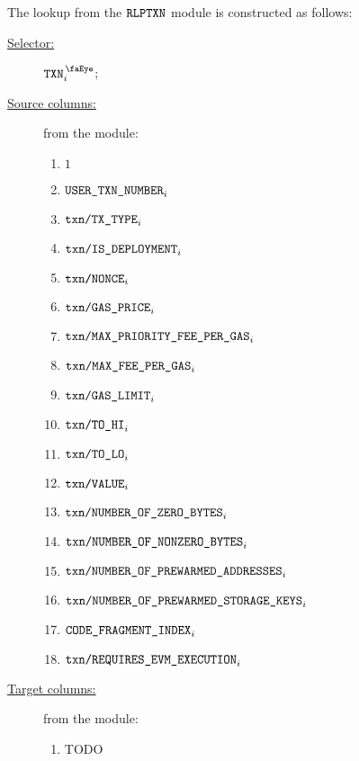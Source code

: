 The lookup from the $\texttt{RLPTXN}$ module is constructed as follows:
\begin{description}
	\item[\underline{Selector:}] $\isTxn _{i}$;
	\item[\underline{Source columns:}] from the \rlpTxnMod{} module:
		\begin{multicols}{3}
			\begin{enumerate}
				\item $1$
				\item $\texttt{USER}\texttt{\_}\texttt{TXN\_NUMBER}                       _{i}$
				\item $\texttt{txn}\texttt{/}\texttt{{TX\_TYPE}}               _{i}$
				\item $\texttt{txn}\texttt{/}\texttt{{IS\_DEPLOYMENT}}                _{i}$
				\item $\texttt{txn}\texttt{/}\texttt{{\texttt{NONCE}}}                _{i}$
				\item $\texttt{txn}\texttt{/}\texttt{{GAS\_PRICE}}             _{i}$
				\item $\texttt{txn}\texttt{/}\texttt{{MAX\_PRIORITY\_FEE\_PER\_GAS}} _{i}$
				\item $\texttt{txn}\texttt{/}\texttt{{MAX\_FEE\_PER\_GAS}}         _{i}$
				\item $\texttt{txn}\texttt{/}\texttt{{GAS\_LIMIT}}             _{i}$
				\item $\texttt{txn}\texttt{/}\texttt{{TO\_HI}}                 _{i}$
				\item $\texttt{txn}\texttt{/}\texttt{{TO\_LO}}                 _{i}$
				\item $\texttt{txn}\texttt{/}\texttt{{VALUE}}             _{i}$
				\item $\texttt{txn}\texttt{/}\texttt{{NUMBER\_OF\_ZERO\_BYTES}}         _{i}$
				\item $\texttt{txn}\texttt{/}\texttt{{NUMBER\_OF\_NONZERO\_BYTES}}      _{i}$
				\item $\texttt{txn}\texttt{/}\texttt{{NUMBER\_OF\_PREWARMED\_ADDRESSES}}      _{i}$
				\item $\texttt{txn}\texttt{/}\texttt{{NUMBER\_OF\_PREWARMED\_STORAGE\_KEYS}}   _{i}$
				\item $\texttt{CODE\_FRAGMENT\_INDEX}                                         _{i}$
				\item $\texttt{txn}\texttt{/}\texttt{{REQUIRES\_EVM\_EXECUTION}} _{i}$
			\end{enumerate}
		\end{multicols}
	\item[\underline{Target columns:}] from the \userTxnDataMod{} module: 
		\begin{multicols}{3}
			\begin{enumerate}
				\item TODO
			\end{enumerate} 
		\end{multicols}
\end{description}

